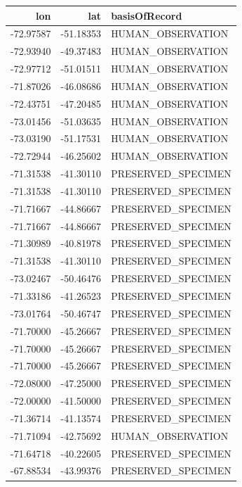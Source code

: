 \documentclass[]{book}
\begin{document}
\begin{tabular}{r|r|l}
\hline
lon & lat & basisOfRecord\\
\hline
-72.97587 & -51.18353 & HUMAN\_OBSERVATION\\
\hline
-72.93940 & -49.37483 & HUMAN\_OBSERVATION\\
\hline
-72.97712 & -51.01511 & HUMAN\_OBSERVATION\\
\hline
-71.87026 & -46.08686 & HUMAN\_OBSERVATION\\
\hline
-72.43751 & -47.20485 & HUMAN\_OBSERVATION\\
\hline
-73.01456 & -51.03635 & HUMAN\_OBSERVATION\\
\hline
-73.03190 & -51.17531 & HUMAN\_OBSERVATION\\
\hline
-72.72944 & -46.25602 & HUMAN\_OBSERVATION\\
\hline
-71.31538 & -41.30110 & PRESERVED\_SPECIMEN\\
\hline
-71.31538 & -41.30110 & PRESERVED\_SPECIMEN\\
\hline
-71.71667 & -44.86667 & PRESERVED\_SPECIMEN\\
\hline
-71.71667 & -44.86667 & PRESERVED\_SPECIMEN\\
\hline
-71.30989 & -40.81978 & PRESERVED\_SPECIMEN\\
\hline
-71.31538 & -41.30110 & PRESERVED\_SPECIMEN\\
\hline
-73.02467 & -50.46476 & PRESERVED\_SPECIMEN\\
\hline
-71.33186 & -41.26523 & PRESERVED\_SPECIMEN\\
\hline
-73.01764 & -50.46747 & PRESERVED\_SPECIMEN\\
\hline
-71.70000 & -45.26667 & PRESERVED\_SPECIMEN\\
\hline
-71.70000 & -45.26667 & PRESERVED\_SPECIMEN\\
\hline
-71.70000 & -45.26667 & PRESERVED\_SPECIMEN\\
\hline
-72.08000 & -47.25000 & PRESERVED\_SPECIMEN\\
\hline
-72.00000 & -41.50000 & PRESERVED\_SPECIMEN\\
\hline
-71.36714 & -41.13574 & PRESERVED\_SPECIMEN\\
\hline
-71.71094 & -42.75692 & HUMAN\_OBSERVATION\\
\hline
-71.64718 & -40.22605 & PRESERVED\_SPECIMEN\\
\hline
-67.88534 & -43.99376 & PRESERVED\_SPECIMEN\\
\hline
\end{tabular}
\end{document}
